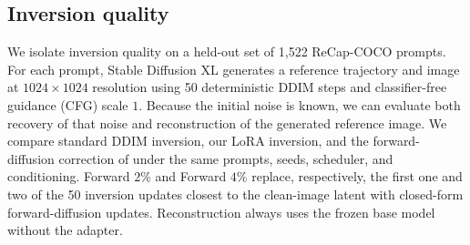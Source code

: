 \documentclass{article} %
\begin{document}
\subsection{Inversion quality}
We isolate inversion quality on a held-out set of 1,522 ReCap-COCO prompts. For each prompt, Stable Diffusion XL generates a reference trajectory and image at $1024\times1024$ resolution using 50 deterministic DDIM steps and classifier-free guidance (CFG) scale $1$. Because the initial noise is known, we can evaluate both recovery of that noise and reconstruction of the generated reference image. We compare standard DDIM inversion, our LoRA inversion, and the forward-diffusion correction of \citet{staniszewski2026there} under the same prompts, seeds, scheduler, and conditioning. Forward $2\%$ and Forward $4\%$ replace, respectively, the first one and two of the 50 inversion updates closest to the clean-image latent with closed-form forward-diffusion updates. Reconstruction always uses the frozen base model without the adapter.
\end{document}
